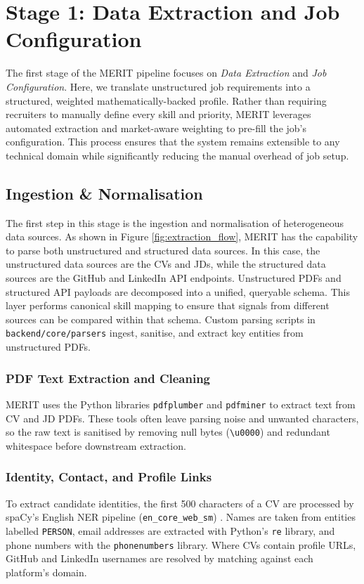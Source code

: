 \section{Stage 1: Data Extraction and Job Configuration}
\label{sec:stage1-extraction}
The first stage of the MERIT pipeline focuses on \textit{Data Extraction} and \textit{Job Configuration}.
Here, we translate unstructured job requirements into a structured, weighted mathematically-backed profile.
Rather than requiring recruiters to manually define every skill and priority, MERIT leverages automated extraction
and market-aware weighting to pre-fill the job's configuration.
This process ensures that the system remains
extensible to any technical domain while significantly reducing the manual overhead of
job setup.


\subsection{Ingestion \& Normalisation}
\label{subsec:ingestion-normalisation}
The first step in this stage is the ingestion and normalisation of heterogeneous data sources.
As shown in Figure \ref{fig:extraction_flow}, 
MERIT has the capability to parse both unstructured and structured data sources. In this 
case, the unstructured data sources are the CVs and JDs, while the structured data sources 
are the GitHub and LinkedIn API endpoints. Unstructured PDFs and structured API payloads are 
decomposed into a unified, queryable schema. This layer performs canonical skill mapping 
to ensure that signals from different sources can be compared within that schema.
Custom parsing scripts in \texttt{backend/core/parsers} ingest, sanitise, and extract key entities from unstructured PDFs.



\subsubsection{PDF Text Extraction and Cleaning}
MERIT uses the Python libraries \texttt{pdfplumber} and \texttt{pdfminer} \cite{pdfplumber,pdfminer} to extract text from CV and JD PDFs.
These tools often leave parsing noise and unwanted characters, so the raw text is sanitised by removing null bytes
(\verb|\u0000|) and redundant whitespace before downstream extraction.

\subsubsection{Identity, Contact, and Profile Links}
To extract candidate identities, the first 500 characters of a CV are processed by spaCy's English NER pipeline
(\texttt{en\_core\_web\_sm}) \cite{spacy2020}. Names are taken from entities labelled \texttt{PERSON},
email addresses are extracted with Python's \texttt{re} library, and phone numbers with the \texttt{phonenumbers} library.
Where CVs contain profile URLs, GitHub and LinkedIn usernames are resolved by matching against each platform's domain.

